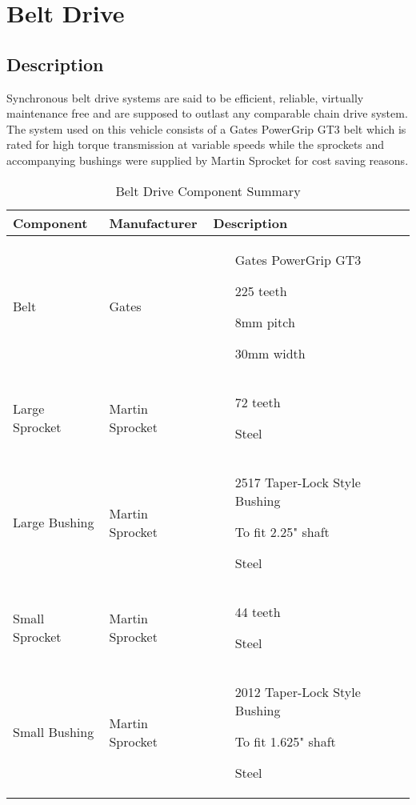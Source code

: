 \section{Belt Drive}
\subsection{Description}
Synchronous belt drive systems are said to be efficient, reliable, virtually maintenance free and are supposed to outlast any comparable chain drive system. The system used on this vehicle consists of a Gates PowerGrip GT3 belt which is rated for high torque transmission at variable speeds while the sprockets and accompanying bushings were supplied by Martin Sprocket for cost saving reasons.

 \begin{table}[htbp]
 	\centering
 	\caption{Belt Drive Component Summary}
 	\begin{tabular}{| lll |} \hline
 		Component & Manufacturer & Description \\ \hline
 		Belt & Gates & \begin{itemize}\item[Gates PowerGrip GT3]\item[225 teeth]\item[8mm pitch]\item[30mm width]
 		\end{itemize} \\
 		Large Sprocket & Martin Sprocket & \begin{itemize}\item[72 teeth]\item[Steel]\end{itemize} \\
 		Large Bushing & Martin Sprocket & \begin{itemize}\item[2517 Taper-Lock Style Bushing]\item[To fit 2.25" shaft]\item[Steel]
 		\end{itemize} \\
 		Small Sprocket & Martin Sprocket & \begin{itemize}\item[44 teeth]\item[Steel]\end{itemize} \\
 		Small Bushing & Martin Sprocket & \begin{itemize}\item[2012 Taper-Lock Style Bushing]\item[To fit 1.625" shaft]\item[Steel]
 		\end{itemize} \\ 
 	\end{tabular}
 	\label{tab:drive_comp}
 \end{table}


